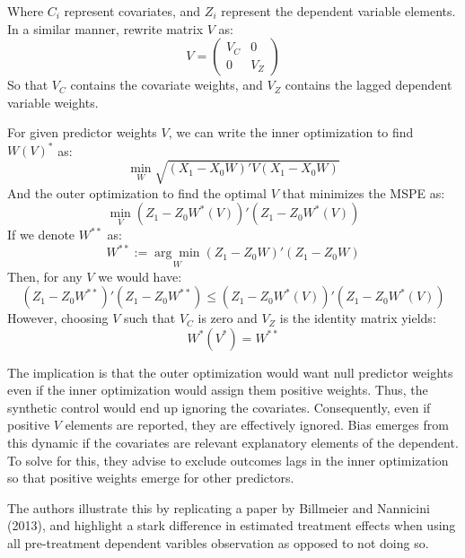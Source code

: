 \documentclass[12pt,a4paper,draft]{article}
\begin{document}
Where $C_i$ represent covariates, and $Z_i$ represent the dependent variable elements.
In a similar manner, rewrite matrix $V$ as:
\begin{equation}
    V = \begin{pmatrix}
        V_C & 0 \\
        0 & V_Z
    \end{pmatrix}
\end{equation}
So that $V_C$ contains the covariate weights, and $V_Z$ contains the lagged dependent 
variable weights.

For given predictor weights $V$, we can write the inner optimization to find $W(V)^*$ as:
\begin{equation}
    \min_{W} \sqrt{(X_1-X_0 W)' V (X_1-X_0 W)}
\end{equation}
And the outer optimization to find the optimal $V$ that minimizes the MSPE as:
\begin{equation}
    \min_V (Z_1 - Z_0  W^*(V))' (Z_1 - Z_0 W^*(V))
\end{equation}
If we denote $W^{**}$ as:
\begin{equation}
    W^{**} := \underset{W}{\arg\min}  (Z_1 -Z_0 W)' (Z_1-Z_0 W) 
\end{equation}
Then, for any $V$ we would have:
\begin{equation}
    (Z_1-Z_0 W^{**})' (Z_1-Z_0 W^{**}) \le (Z_1 - Z_0  W^*(V))' (Z_1 - Z_0 W^*(V))
\end{equation}
However, choosing $V$ such that $V_C$ is zero and $V_Z$ is the identity matrix yields:
\begin{equation}
    W^* (V^*) = W^{**}
\end{equation}

The implication is that the outer optimization would want null predictor weights 
even if the inner optimization would assign them positive weights. Thus, the synthetic 
control would end up ignoring the covariates. Consequently, even if positive $V$ elements 
are reported, they are effectively ignored. Bias emerges from this dynamic if the 
covariates are relevant explanatory elements of the dependent. To solve for this, they 
advise to exclude outcomes lags in the inner optimization so that positive weights 
emerge for other predictors.

The authors illustrate this by replicating a paper by Billmeier and Nannicini (2013), 
and highlight a stark difference in estimated treatment effects when using all 
pre-treatment dependent varibles observation as opposed to not doing so. 
\end{document}

